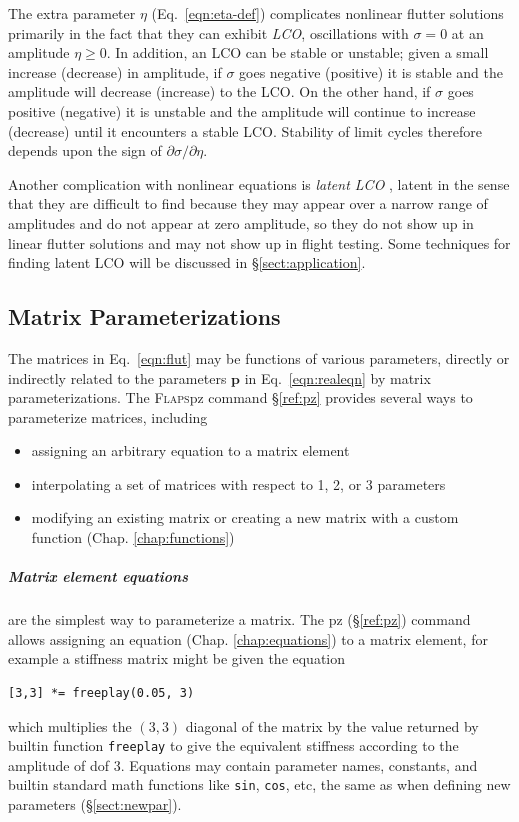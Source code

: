 \documentclass[11pt,openany,twoside]{book}
\numberwithin{equation}{section}		%
\newcommand{\Cmd}[1]{{\sf #1}}
\newcommand{\Newterm}[1]{{\em #1}}
\newcommand{\Code}[1]{{\small\tt #1}}
\newcommand{\Flaps}{\textsc{Flaps\:}}
\newcommand{\Vector}[1]{\boldsymbol{#1}}
\newcommand{\Sectref}[1]{\S\ref{#1}}
\newcommand{\Chapref}[1]{Chap. \ref{#1}}
\newcommand{\Eqn}[1]{Eq.\ \ref{#1}}  %
\begin{document}
The extra parameter $\eta$ (\Eqn{eqn:eta-def}) complicates nonlinear
flutter solutions primarily in the fact that they can exhibit \Newterm{LCO},
 oscillations with $\sigma=0$
at an amplitude $\eta \ge 0$. In addition, an LCO can be stable or unstable;
given a small increase (decrease) in amplitude, if $\sigma$ goes
negative (positive) it is stable and the amplitude will decrease
(increase) to the LCO. On the other hand, if $\sigma$ goes positive
(negative) it is unstable and the amplitude will continue to increase
(decrease) until it encounters a stable LCO.
Stability of limit cycles therefore depends upon the sign of
$\partial \sigma/\partial \eta$.
\par
Another complication with nonlinear equations is
\Newterm{latent LCO} \cite{meyer2021latent},
latent in the sense that they are difficult to find
because they may appear over a narrow range of amplitudes and
do not appear at zero amplitude, so they do not show up in linear
flutter solutions and may not show up in flight testing.
Some techniques for finding latent LCO will be discussed in
\Sectref{sect:application}.


\subsection{Matrix Parameterizations}\label{sect:pz}
The matrices in \Eqn{eqn:flut} may be functions of various parameters, directly
or indirectly related to the parameters $\Vector{p}$ in \Eqn{eqn:realeqn} by
matrix parameterizations.
The \Flaps \Cmd{pz} command \Sectref{ref:pz} provides several ways to
parameterize matrices, including
\begin{itemize}
\item assigning an arbitrary equation to a matrix element
\item interpolating a set of matrices with respect to 1, 2, or 3 parameters
\item modifying an existing matrix or creating a new matrix
      with a custom function (\Chapref{chap:functions})
\end{itemize}

\subparagraph{Matrix element equations} are the simplest way
to parameterize a matrix. The \Cmd{pz} (\Sectref{ref:pz}) command allows assigning
an equation (\Chapref{chap:equations}) to a matrix element,
for example a stiffness matrix might be given the equation
\begin{lstlisting}
[3,3] *= freeplay(0.05, 3)
\end{lstlisting}
which multiplies the $(3,3)$ diagonal of the matrix by the value
returned by builtin function \Code{freeplay} to give
the equivalent stiffness according to the amplitude of dof 3.
Equations may contain parameter names, constants, and builtin
standard math functions like \Code{sin}, \Code{cos}, etc,
the same as when defining new parameters (\Sectref{sect:newpar}).
\end{document}
